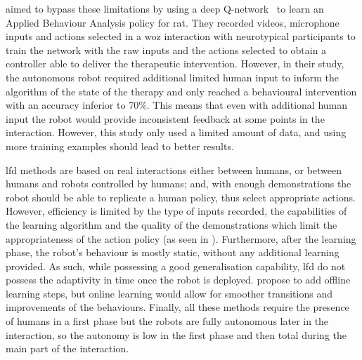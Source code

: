     \cite{clark2018deep} aimed to bypass these limitations by using a deep Q-network~\citep{mnih2015human} to learn an Applied Behaviour Analysis policy for \gls{rat}. They recorded videos, microphone inputs and actions selected in a \gls{woz} interaction with neurotypical participants to train the network with the raw inputs and the actions selected to obtain a controller able to deliver the therapeutic intervention. However, in their study, the autonomous robot required additional limited human input to inform the algorithm of the state of the therapy and only reached a behavioural intervention with an accuracy inferior to 70\%. This means that even with additional human input the robot would provide inconsistent feedback at some points in the interaction. However, this study only used a limited amount of data, and using more training examples should lead to better results.
     
    \gls{lfd} methods are based on real interactions either between humans, or between humans and robots controlled by humans; and, with enough demonstrations the robot should be able to replicate a human policy, thus select appropriate actions. However, efficiency is limited by the type of inputs recorded, the capabilities of the learning algorithm and the quality of the demonstrations which limit the appropriateness of the action policy (as seen in \citealt{clark2018deep}). Furthermore, after the learning phase, the robot's behaviour is  mostly static, without any additional learning provided. As such, while possessing a good generalisation capability, \gls{lfd} do not possess the adaptivity in time once the robot is deployed. \cite{sequeira2016discovering} propose to add offline learning steps, but online learning would allow for smoother transitions and improvements of the behaviours.
    Finally, all these methods require the presence of humans in a first phase but the robots are fully autonomous later in the interaction, so the autonomy is low in the first phase and then total during the main part of the interaction.
    
